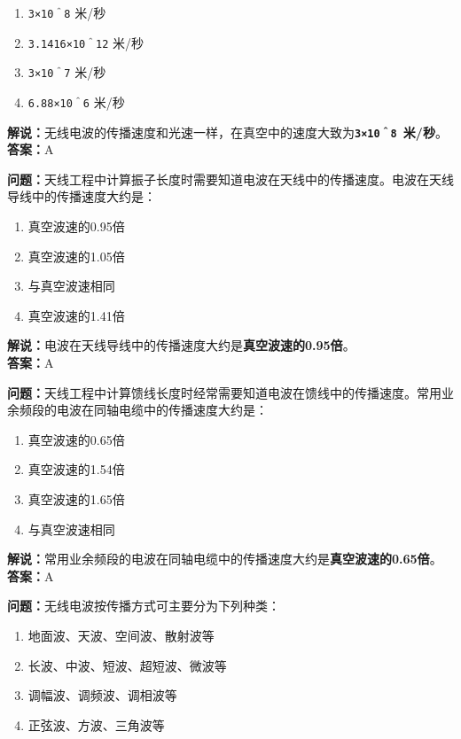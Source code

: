 \begin{enumerate}[label=\Alph*), leftmargin=1cm]
	\item \texttt{3×10＾8} 米/秒
	\item \texttt{3.1416×10＾12} 米/秒
	\item \texttt{3×10＾7} 米/秒
	\item \texttt{6.88×10＾6} 米/秒
\end{enumerate}

\textbf{解说：}无线电波的传播速度和光速一样，在真空中的速度大致为\textbf{\texttt{3×10＾8 }米/秒}。\\\textbf{答案：}A%



\textbf{问题：}天线工程中计算振子长度时需要知道电波在天线中的传播速度。电波在天线导线中的传播速度大约是：

\begin{enumerate}[label=\Alph*), leftmargin=1cm]
	\item 真空波速的0.95倍
	\item 真空波速的1.05倍
	\item 与真空波速相同
	\item 真空波速的1.41倍
\end{enumerate}

\textbf{解说：}电波在天线导线中的传播速度大约是\textbf{真空波速的0.95倍}。\\\textbf{答案：}A%



\textbf{问题：}天线工程中计算馈线长度时经常需要知道电波在馈线中的传播速度。常用业余频段的电波在同轴电缆中的传播速度大约是：

\begin{enumerate}[label=\Alph*), leftmargin=1cm]
	\item 真空波速的0.65倍
	\item 真空波速的1.54倍
	\item 真空波速的1.65倍
	\item 与真空波速相同
\end{enumerate}

\textbf{解说：}常用业余频段的电波在同轴电缆中的传播速度大约是\textbf{真空波速的0.65倍}。\\\textbf{答案：}A%



\textbf{问题：}无线电波按传播方式可主要分为下列种类：

\begin{enumerate}[label=\Alph*), leftmargin=1cm]
	\item 地面波、天波、空间波、散射波等
	\item 长波、中波、短波、超短波、微波等
	\item 调幅波、调频波、调相波等
	\item 正弦波、方波、三角波等
\end{enumerate}

